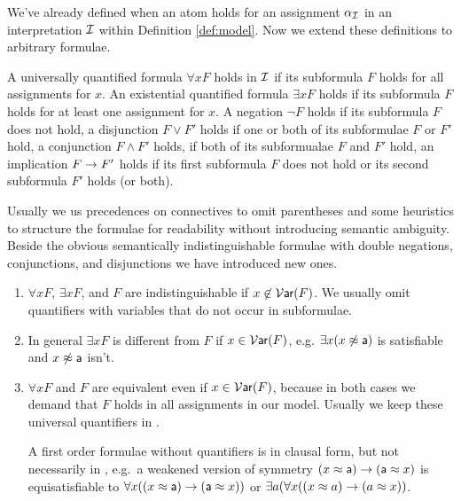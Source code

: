 We've already defined when an atom holds for an assignment $\alpha_{\mathcal I}$ 
in an interpretation ${\mathcal I}$ within Definition \vref{def:model}.
Now we extend these definitions to arbitrary formulae.

\begin{definition}
	
	A universally quantified formula $\forall x F$ holds in ${\mathcal I}$ if its subformula $F$ holds for all assignments for $x$.
	An existential quantified formula $\exists xF$ holds if its subformula $F$ holds for at least one assignment for $x$.
	A negation $\lnot F$ holds if its subformula $F$ does not hold, 
	a disjunction $F\lor F'$ holds if one or both of its subformulae $F$ or $F'$ hold,
	a conjunction $F\land F'$ holds, if both of its subformualae $F$ and $F'$ hold, 
	an implication $F\rightarrow F'$ holds if its first subformula $F$ does not hold or its second subformula $F'$ holds (or both).
\end{definition}

\begin{remark}Usually we us precedences on connectives to omit parentheses 
	and some heuristics to structure the formulae for readability 
	without introducing semantic ambiguity.
%
	Beside the obvious semantically indistinguishable formulae with double negations, conjunctions, and disjunctions 
	we have introduced new ones.
	\begin{enumerate}
		\item $\forall x F$, $\exists x F$, and $F$ are indistinguishable if $x\not\in\operatorname{\mathcal{V}\mathsf{ar}}(F)$. 
		We usually omit quantifiers with variables that do not occur in subformulae.
		\item In general $\exists x F$ is different from $F$ if $x\in\operatorname{\mathcal{V}\mathsf{ar}}(F)$, e.g. $\exists x(x\not\approx{\mathsf a})$ is satisfiable and $x\not\approx{\mathsf a}$ isn't.
		\item $\forall x F$ and $F$ are equivalent even if $x\in\operatorname{\mathcal{V}\mathsf{ar}}(F)$, 
		because in both cases we demand that $F$ holds in all assignments in our model.
		Usually we keep these universal quantifiers in \FOF.
		
		A first order formulae without quantifiers is in {\myem clausal form}, 
		but not necessarily in \CNF, e.g.~a weakened version of symmetry $(x\approx {\mathsf a})\rightarrow ({\mathsf a}\approx x)$ 
		is equisatisfiable to $\forall x ((x\approx {\mathsf a})\rightarrow ({\mathsf a}\approx x))$ 
		or $\exists a (\forall x ((x\approx a)\rightarrow (a\approx x))$. 
	\end{enumerate}

\end{remark}













